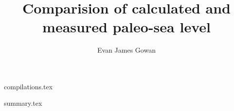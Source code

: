 \documentclass[a4paper,12pt]{article}
\begin{document}
\title{Comparision of calculated and measured paleo-sea level}

\author{Evan James Gowan}
    
\date{}

\maketitle

\tableofcontents

\newpage

{compilations.tex}

\newpage

{summary.tex}

\clearpage

\newpage



\end{document}
